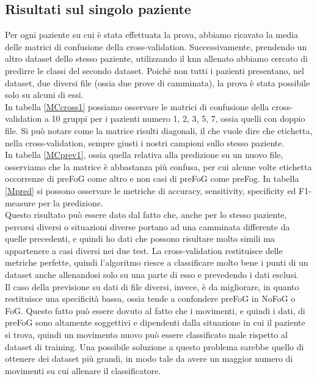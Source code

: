 \subsection{Risultati sul singolo paziente}
Per ogni paziente su cui è stata effettuata la prova, abbiamo ricavato la media delle matrici di confusione della cross-validation. Successivamente, prendendo un altro dataset dello stesso paziente, utilizzando il knn allenato abbiamo cercato di predirre le classi del secondo dataset. Poiché non tutti i pazienti presentano, nel dataset, due diversi file (ossia due prove di camminata), la prova è stata possibile solo su alcuni di essi.\\
In tabella \ref{MCcross1} possiamo osservare le matrici di confusione della cross-validation a 10 gruppi per i pazienti numero 1, 2, 3, 5, 7, ossia quelli con doppio file. Si può notare come la matrice risulti diagonali, il che vuole dire che etichetta, nella cross-validation, sempre giusti i nostri campioni sullo stesso paziente.\\
In tabella \ref{MCprev1}, ossia quella relativa alla predizione su un nuovo file, osserviamo che la matrice è abbastanza più confusa, per cui alcune volte etichetta occorrenze di preFoG come altro e non casi di preFoG come preFog. In tabella \ref{Mpred} si possono osservare le metriche di accuracy, sensitivity, specificity ed F1-measure per la predizione.\\
Questo risultato può essere dato dal fatto che, anche per lo stesso paziente, percorsi diversi o situazioni diverse portano ad una camminata differente da quelle precedenti, e quindi ho dati che possono risultare molto simili ma appartenere a casi diversi nei due test. La cross-validation restituisce delle metriche perfette, quindi l'algoritmo riesce a classificare molto bene i punti di un dataset anche allenandosi solo su una parte di esso e prevedendo i dati esclusi.\\
Il caso della previsione su dati di file diversi, invece, è  da migliorare, in quanto restituisce una specificità bassa, ossia tende a confondere preFoG in NoFoG o FoG. Questo fatto può essere dovuto al fatto che i movimenti, e quindi i dati, di preFoG sono altamente soggettivi e dipendenti dalla situazione in cui il paziente si trova, quindi un movimento nuovo può essere classificato male rispetto al dataset di training. Una possibile soluzione a questo problema sarebbe quello di ottenere dei dataset più grandi, in modo tale da avere un maggior numero di movimenti su cui allenare il classificatore.
